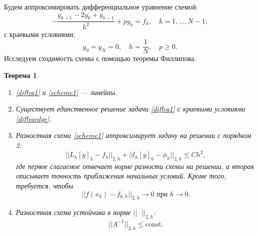\documentclass[14pt,a4paper]{extarticle}
\newtheorem{theorem}{Теорема} %
\newcommand{\1}{\mathbbm{1}}
\begin{document}
Будем аппроксимировать дифференциальное уравнение схемой:
\begin{equation} \label{scheme1}
    -\frac{y_{k+1} - 2 y_k + y_{k-1}}{h^2} + p y_k = f_k, \quad k = 1, \ldots, N - 1;
\end{equation}
с краевыми условиями:
\begin{equation} \label{schemeedge}
    y_0 = y_N = 0,
    \quad h = \frac{1}{N}, 
    \quad p \geq 0.
\end{equation}
Исследуем сходимость схемы с помощью теоремы Филлипова.
\begin{theorem}
    \begin{enumerate}
        \item \eqref{diffeq1} и \eqref{scheme1} --- линейны.
        \item Существует единственное решение задачи \eqref{diffeq1} с краевыми условиями \eqref{diffeqedge}.
        \item Разностная схема \eqref{scheme1} аппроксимирует задачу на решении с порядком 2:
            \begin{equation*}
                || L_h [y]_h - f_h || _{2, h} + || l_h [y]_h - \phi_h || _{2, h} \leq C h^2,           
            \end{equation*}
            где первое слагаемое отвечает норме разности схемы на решении, а вторая описывает точность 
            приближения начальных условий. Кроме того, требуется, чтобы
            \begin{equation*}
                || f(x_k) - f_{k, h}|| _{2, h} \rightarrow 0 \text{ при } h \rightarrow 0.           
            \end{equation*}
        \item Разностная схема устойчива в норме $||\cdot||_{2,h}$:
        \begin{equation*}
            || A^{-1} ||_{2,h} \leq \text{const}.
        \end{equation*}
    \end{enumerate}
\end{theorem}
\end{document}
